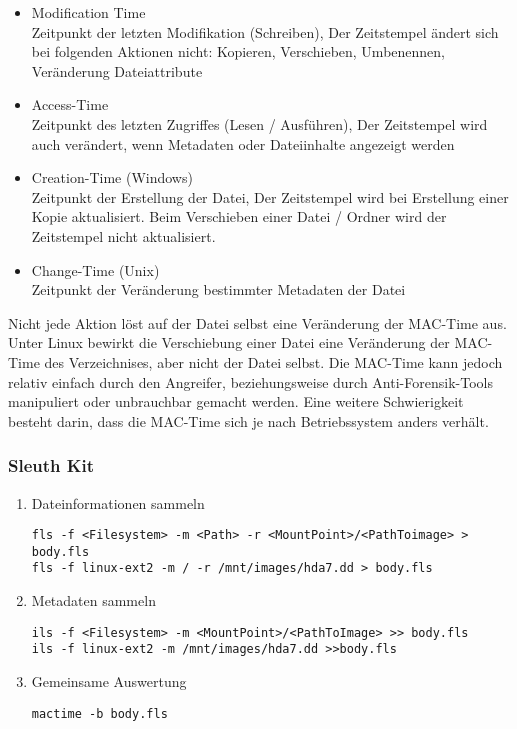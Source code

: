 \begin{itemize}
\item Modification Time\\
Zeitpunkt der letzten Modifikation (Schreiben), Der Zeitstempel ändert sich bei folgenden Aktionen nicht: Kopieren, Verschieben, Umbenennen, Veränderung Dateiattribute
\item Access-Time\\
Zeitpunkt des letzten Zugriffes (Lesen / Ausführen), Der Zeitstempel wird auch verändert, wenn Metadaten oder Dateiinhalte angezeigt werden
\item Creation-Time (Windows)\\
Zeitpunkt der Erstellung der Datei, Der Zeitstempel wird bei Erstellung einer Kopie aktualisiert. Beim Verschieben einer Datei / Ordner wird der Zeitstempel nicht aktualisiert.
\item Change-Time (Unix)\\
Zeitpunkt der Veränderung bestimmter Metadaten der Datei
\end{itemize}

Nicht jede Aktion löst auf der Datei selbst eine Veränderung der MAC-Time aus. Unter Linux bewirkt die Verschiebung einer Datei eine Veränderung der MAC-Time des Verzeichnises, aber nicht der Datei selbst. Die MAC-Time kann jedoch relativ einfach durch den Angreifer, beziehungsweise durch Anti-Forensik-Tools manipuliert oder unbrauchbar gemacht werden. Eine weitere Schwierigkeit besteht darin, dass die MAC-Time sich je nach Betriebssystem anders verhält.


\subsubsection{Sleuth Kit}
\begin{enumerate}
\item Dateinformationen sammeln
\begin{lstlisting}
fls -f <Filesystem> -m <Path> -r <MountPoint>/<PathToimage> > body.fls
fls -f linux-ext2 -m / -r /mnt/images/hda7.dd > body.fls
\end{lstlisting}

\item Metadaten sammeln
\begin{lstlisting}
ils -f <Filesystem> -m <MountPoint>/<PathToImage> >> body.fls
ils -f linux-ext2 -m /mnt/images/hda7.dd >>body.fls
\end{lstlisting}

\item Gemeinsame Auswertung
\begin{lstlisting}
mactime -b body.fls
\end{lstlisting}
\end{enumerate}

